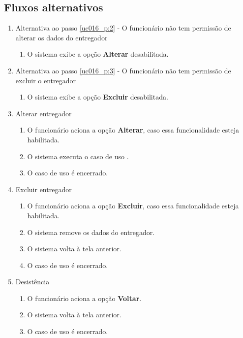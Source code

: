 \subsection{Fluxos alternativos}

\begin{enumerate}[label=A\arabic*]
	\item Alternativa ao passo \ref{uc016_p:2} - O funcionário não tem permissão de alterar os dados do entregador \label{uc016_a:1}
	\begin{enumerate}[label*=.\arabic*]
		\item O sistema exibe a opção \textbf{Alterar} desabilitada.
	\end{enumerate}
	
	\item Alternativa ao passo \ref{uc016_p:3} - O funcionário não tem permissão de excluir o entregador \label{uc016_a:2}
	\begin{enumerate}[label*=.\arabic*]
		\item O sistema exibe a opção \textbf{Excluir} desabilitada.
	\end{enumerate}
		
	\item Alterar entregador
	\begin{enumerate}[label*=.\arabic*]
		\item O funcionário aciona a opção \textbf{Alterar}, caso essa funcionalidade esteja habilitada.
		\item O sistema executa o caso de uso .
		\item O caso de uso é encerrado.
	\end{enumerate}
	
	\item Excluir entregador
	\begin{enumerate}[label*=.\arabic*]
		\item O funcionário aciona a opção \textbf{Excluir}, caso essa funcionalidade esteja habilitada.
		\item O sistema remove os dados do entregador. \label{uc016_a:4:2}
		\item O sistema volta à tela anterior.
		\item O caso de uso é encerrado.
	\end{enumerate}
		
	\item Desistência
	\begin{enumerate}[label*=.\arabic*]
		\item O funcionário aciona a opção \textbf{Voltar}.
		\item O sistema volta à tela anterior.
		\item O caso de uso é encerrado.		
	\end{enumerate}
\end{enumerate}

